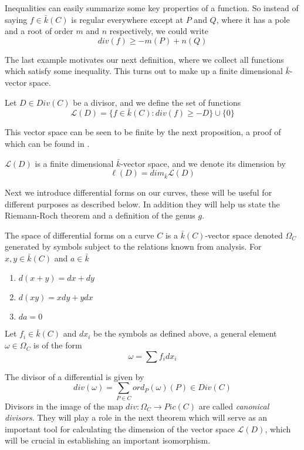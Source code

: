 \begin{ex}
 Inequalities can easily summarize some key properties of a function. So instead of
saying $f \in \bar{k}(C)$ is regular everywhere except at $P$ and $Q$, where it has a
pole and a root of order $m$ and $n$ respectively, we could write
$$ div(f) \geq -m(P)+n(Q) $$
\end{ex}



The last example motivates our next definition, where we collect all functions
which satisfy some inequality. This turns out to make up a finite dimensional
$\bar{k}$-vector space.

\begin{mydef}
 Let $D \in Div(C)$ be a divisor, and we define the set of functions
$$ \mathscr{L}(D) = \{ f\in \bar{k}(C) : div(f) \geq -D \} \cup \{ 0\} $$
\end{mydef}

This vector space can be seen to be finite by the next proposition, a proof of
which can be found in \cite{Fulton}.

\begin{prop}
 $\mathscr{L}(D)$ is a finite dimensional $\bar{k}$-vector space, and we denote
its dimension by
$$ \ell(D) = dim_{\bar{k}} \mathscr{L}(D) $$
\end{prop}

Next we introduce differential forms on our curves, these will be useful for different purposes
as described below. In addition they will help us state the Riemann-Roch theorem and a definition
of the genus $g$.

\begin{mydef}
 The space of differential forms on a curve $C$ is a $\bar{k}(C)$-vector space denoted $\Omega_C$
generated by symbols subject to the relations known from analysis. 
For $x, y \in \bar{k}(C)$ and $a \in \bar{k}$
\begin{enumerate}
  \item $d(x+y) = dx + dy$
  \item $d(xy) = xdy + ydx$
  \item $da = 0$
\end{enumerate}
Let $f_i \in \bar{k}(C)$ and $dx_i$ be the symbols as defined above, a general
element $\omega \in \Omega_C$ is of the form
$$ \omega = \sum f_i dx_i $$
\end{mydef}

The divisor of a differential is given by
$$ div(\omega) = \sum_{P\in C} ord_P(\omega)(P) \in Div(C)$$
Divisors in the image of the map $div: \Omega_C \rightarrow Pic(C)$ are called
\emph{canonical divisors}. They will play a role in the next theorem which will
serve as an important tool for calculating the dimension of the vector space
$\mathscr{L}(D)$, which will be crucial in establishing an important isomorphism.

